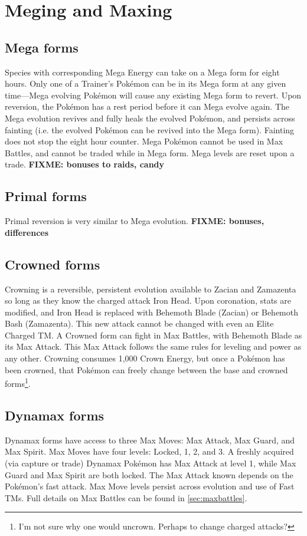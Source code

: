\chapter{Meging and Maxing}
\label{chap:megmax}

\section{Mega forms}
\label{sec:mega}
Species with corresponding Mega Energy can take on a Mega form for eight hours.
Only one of a Trainer's Pokémon can be in its Mega form at any given time---Mega
  evolving Pokémon will cause any existing Mega form to revert.
Upon reversion, the Pokémon has a rest period before it can Mega evolve again.
The Mega evolution revives and fully heals the evolved Pokémon, and persists across
  fainting (i.e. the evolved Pokémon can be revived into the Mega form).
Fainting does not stop the eight hour counter.
Mega Pokémon cannot be used in Max Battles, and cannot be traded while in Mega form.
Mega levels are reset upon a trade.
\textbf{FIXME: bonuses to raids, candy}


\section{Primal forms}
\label{sec:primal}
Primal reversion is very similar to Mega evolution.
\textbf{FIXME: bonuses, differences}


\section{Crowned forms}
\label{sec:crowned}
Crowning is a reversible, persistent evolution available to Zacian and Zamazenta
 so long as they know the charged attack Iron Head.
Upon coronation, stats are modified, and Iron Head is replaced with Behemoth Blade (Zacian)
  or Behemoth Bash (Zamazenta).
This new attack cannot be changed with even an Elite Charged TM\@.
A Crowned form can fight in Max Battles, with Behemoth Blade as its Max Attack.
This Max Attack follows the same rules for leveling and power as any other.
Crowning consumes 1,000 Crown Energy, but once a Pokémon has been crowned,
  that Pokémon can freely change between the base and crowned
  forms\footnote{I'm not sure why one would uncrown. Perhaps to change charged attacks?}.


\section{Dynamax forms}
\label{sec:dmax}
Dynamax forms have access to three Max Moves: Max Attack, Max Guard, and Max Spirit.
Max Moves have four levels: Locked, 1, 2, and 3.
A freshly acquired (via capture or trade) Dynamax Pokémon has Max Attack at level 1,
  while Max Guard and Max Spirit are both locked.
The Max Attack known depends on the Pokémon's fast attack.
Max Move levels persist across evolution and use of Fast TMs.
Full details on Max Battles can be found in \autoref{sec:maxbattles}.



